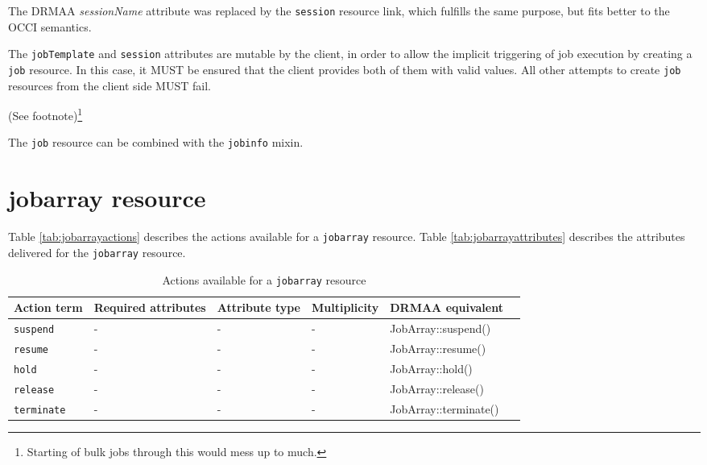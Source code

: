 \documentclass[10pt]{article}
\newcommand{\h}[1]{\lstinline|#1|}
\newcommand{\rat}[1]{ {\tiny(See footnote)}\footnote{#1} }
\begin{document}
The DRMAA \emph{sessionName} attribute was replaced by the \h{session} resource link, which fulfills the same purpose, but fits better to the OCCI semantics.

The \h{jobTemplate} and \h{session} attributes are mutable by the client, in order to allow the implicit triggering of job execution by creating a \h{job} resource. In this case, it MUST be ensured that the client provides both of them with valid values. All other attempts to create \h{job} resources from the client side MUST fail.

\rat{Starting of bulk jobs through this would mess up to much.}

The \h{job} resource can be combined with the \h{jobinfo} mixin. 


\section{jobarray resource}

Table \ref{tab:jobarrayactions} describes the actions available for a \h{jobarray} resource. Table \ref{tab:jobarrayattributes} describes the attributes delivered for the \h{jobarray} resource.

\begin{table}[ht]
\centering
\begin{tabularx}{\textwidth}{|l|l|l|l|X|l|}
\hline
Action term         & Required attributes & Attribute type    & Multiplicity & DRMAA equivalent \\
\hline
\h{suspend}         & -                   &  -                & -            & JobArray::suspend() \\
\h{resume}          & -                   &  -                & -            & JobArray::resume()  \\
\h{hold}            & -                   &  -                & -            & JobArray::hold()    \\
\h{release}         & -                   &  -                & -            & JobArray::release() \\
\h{terminate}       & -                   &  -                & -            & JobArray::terminate() \\
\hline
\end{tabularx}
\caption{Actions available for a \h{jobarray} resource}
\label{tab:jobactions}
\end{table}
\end{document}
